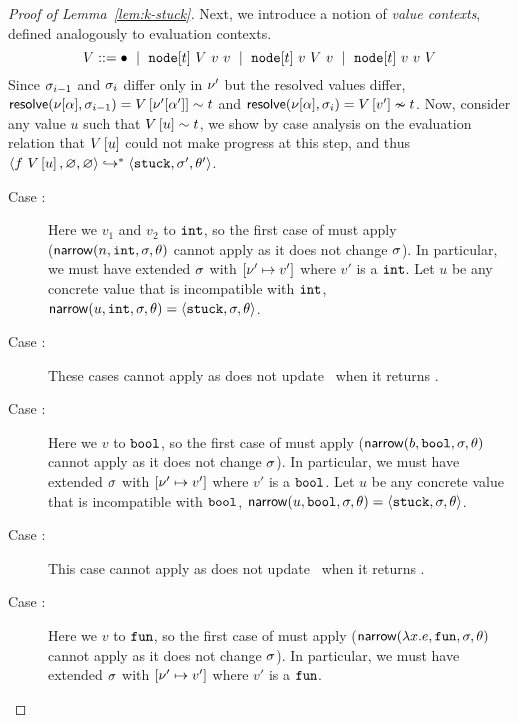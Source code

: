 \begin{proof}[Proof of Lemma~\ref{lem:k-stuck}]
  Next, we introduce a notion of \emph{value contexts}, defined
  analogously to evaluation contexts.
  $$
    V ::= \bullet \ \mid \  \mathtt{node}[t]\ V\ v\ v \ \mid \  \mathtt{node}[t]\ v\ V\ v \ \mid \  \mathtt{node}[t]\ v\ v\ V
  $$
  Since $\sigma_{i-1}$ and $\sigma_{i}$ differ only in $\nu'$ but the resolved
  values differ,
  $\mathsf{resolve}(\nu[\alpha], \sigma_{i-1}) = V\left[\nu'[\alpha']\right] \sim t$
  and
  $\mathsf{resolve}(\nu[\alpha], \sigma_{i}) = V\left[v'\right] \nsim t$.
  Now, consider any value $u$ such that $V\left[u\right] \sim t$,
  we show by case analysis on the evaluation relation that
  $V\left[u\right]$ could not make progress at this step, and thus
  $\langle f\ V\left[u\right], \varnothing, \varnothing \rangle \hookrightarrow^{*} \langle \mathtt{stuck}, \sigma', \theta' \rangle{}$.
    \begin{description}
    \item[Case \replusgood:]
      Here we \forcesym $v_1$ and $v_2$ to $\mathtt{int}$, so the first case of
      \forcesym must apply\\ ($\mathsf{narrow}(n, \mathtt{int}, \sigma, \theta)$ cannot apply
      as it does not change $\sigma$).
      In particular, we must have extended $\sigma$ with
      $[\nu' \mapsto v']$ where $v'$ is a $\mathtt{int}$.
      Let $u$ be any concrete value that is incompatible with $\mathtt{int}$,
      $\mathsf{narrow}(u, \mathtt{int}, \sigma, \theta) = \langle \mathtt{stuck}, \sigma, \theta \rangle$.
    \item[Case :]
      These cases cannot apply as \forcesym does not update \vsu\ when
      it returns \stuck.
    \item[Case :]
      Here we \forcesym $v$ to $\mathtt{bool}$, so the first case of \forcesym
      must apply ($\mathsf{narrow}(b, \mathtt{bool}, \sigma, \theta)$ cannot apply as it
      does not change $\sigma$).
      In particular, we must have extended $\sigma$ with
      $[\nu' \mapsto v']$ where $v'$ is a $\mathtt{bool}$.
      Let $u$ be any concrete value that is incompatible with $\mathtt{bool}$,
      $\mathsf{narrow}(u, \mathtt{bool}, \sigma, \theta) = \langle \mathtt{stuck}, \sigma, \theta \rangle$.
    \item[Case \reifbad:]
      This case cannot apply as \forcesym does not update \vsu\ when
      it returns \stuck.
    \item[Case \reappgood:]
      Here we \forcesym $v$ to $\mathtt{fun}$, so the first case of \forcesym
      must apply ($\mathsf{narrow}(\lambda x. e, \mathtt{fun}, \sigma, \theta)$ cannot apply as it
      does not change $\sigma$).
      In particular, we must have extended $\sigma$ with
      $[\nu' \mapsto v']$ where $v'$ is a $\mathtt{fun}$.

\end{description}
\end{proof}
